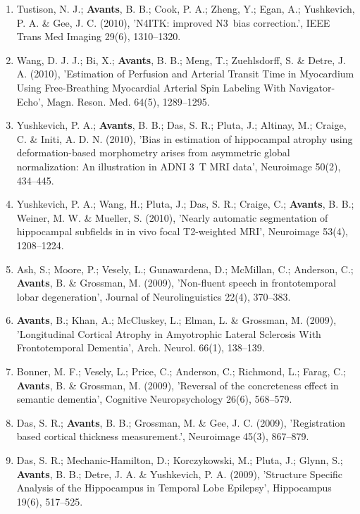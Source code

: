 \documentclass[11pt]{moderncv} %
\begin{document}
\begin{enumerate}
\item  Tustison, N. J.; \textbf{Avants}, B. B.; Cook, P. A.; Zheng, Y.; Egan, A.; Yushkevich, P. A. \&  Gee, J. C. (2010), 'N4ITK: improved N3~bias correction.', IEEE Trans Med Imaging 29(6), 1310--1320.

\item  Wang, D. J. J.; Bi, X.; \textbf{Avants}, B. B.; Meng, T.; Zuehlsdorff, S. \&  Detre, J. A. (2010), 'Estimation of Perfusion and Arterial Transit Time in Myocardium Using Free-Breathing Myocardial Arterial Spin Labeling With Navigator-Echo', Magn. Reson. Med. 64(5), 1289--1295.

\item  Yushkevich, P. A.; \textbf{Avants}, B. B.; Das, S. R.; Pluta, J.; Altinay, M.; Craige, C. \&  Initi, A. D. N. (2010), 'Bias in estimation of hippocampal atrophy using deformation-based morphometry arises from asymmetric global normalization: An illustration in ADNI 3~T MRI data', Neuroimage 50(2), 434--445.

\item  Yushkevich, P. A.; Wang, H.; Pluta, J.; Das, S. R.; Craige, C.; \textbf{Avants}, B. B.; Weiner, M. W. \&  Mueller, S. (2010), 'Nearly automatic segmentation of hippocampal subfields in in vivo focal T2-weighted MRI', Neuroimage 53(4), 1208--1224.

\item  Ash, S.; Moore, P.; Vesely, L.; Gunawardena, D.; McMillan, C.; Anderson, C.; \textbf{Avants}, B. \&  Grossman, M. (2009), 'Non-fluent speech in frontotemporal lobar degeneration', Journal of Neurolinguistics 22(4), 370--383.

\item  \textbf{Avants}, B.; Khan, A.; McCluskey, L.; Elman, L. \&  Grossman, M. (2009), 'Longitudinal Cortical Atrophy in Amyotrophic Lateral Sclerosis With Frontotemporal Dementia', Arch. Neurol. 66(1), 138--139.

\item  Bonner, M. F.; Vesely, L.; Price, C.; Anderson, C.; Richmond, L.; Farag, C.; \textbf{Avants}, B. \&  Grossman, M. (2009), 'Reversal of the concreteness effect in semantic dementia', Cognitive Neuropsychology 26(6), 568--579.

\item  Das, S. R.; \textbf{Avants}, B. B.; Grossman, M. \&  Gee, J. C. (2009), 'Registration based cortical thickness measurement.', Neuroimage 45(3), 867--879.

\item  Das, S. R.; Mechanic-Hamilton, D.; Korczykowski, M.; Pluta, J.; Glynn, S.; \textbf{Avants}, B. B.; Detre, J. A. \&  Yushkevich, P. A. (2009), 'Structure Specific Analysis of the Hippocampus in Temporal Lobe Epilepsy', Hippocampus 19(6), 517--525.


\end{enumerate}
\end{document}
